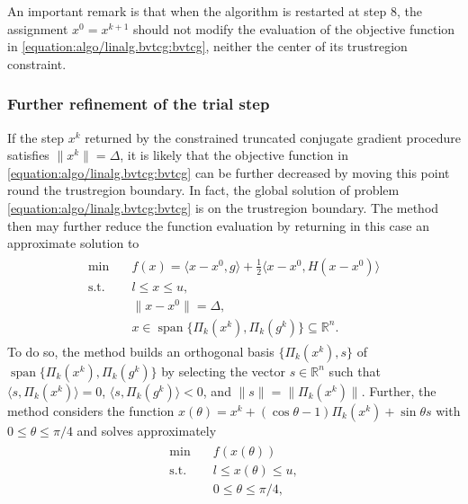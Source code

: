 \documentclass[letterpaper,10pt,english]{sphinxmanual}
\DeclareMathOperator{\vspan}{span}
\newcommand{\norm}[2][]{#1\lVert#2#1\rVert}
\newcommand{\set}[2][]{#1\{#2#1\}}
\newcommand{\inner}[2][]{#1\langle#2#1\rangle}
\def\R{\ensuremath{\mathds{R}}}
\begin{document}
\sphinxAtStartPar
An important remark is that when the algorithm is restarted at step 8, the
assignment \(x^0 = x^{k + 1}\) should not modify the evaluation of the
objective function in \eqref{equation:algo/linalg.bvtcg:bvtcg}, neither the center of its trust\sphinxhyphen{}region
constraint.


\subsubsection{Further refinement of the trial step}
\label{\detokenize{algo/linalg.bvtcg:further-refinement-of-the-trial-step}}
\sphinxAtStartPar
If the step \(x^k\) returned by the constrained truncated conjugate
gradient procedure satisfies \(\norm{x^k} = \Delta\), it is likely that
the objective function in \eqref{equation:algo/linalg.bvtcg:bvtcg} can be further decreased by moving this
point round the trust\sphinxhyphen{}region boundary. In fact, the global solution of problem
\eqref{equation:algo/linalg.bvtcg:bvtcg} is on the trust\sphinxhyphen{}region boundary. The method  then may
further reduce the function evaluation by returning in this case an approximate
solution to
\begin{equation*}
\begin{split}\begin{array}{ll}
    \min        & \quad f(x) = \inner{x - x^0, g} + \frac{1}{2} \inner{x - x^0, H (x - x^0)}\\
    \text{s.t.} & \quad l \le x \le u,\\
                & \quad \norm{x - x^0} = \Delta,\\
                & \quad x \in \vspan \set{\Pi_k(x^k), \Pi_k(g^k)} \subseteq \R^n.
\end{array}\end{split}
\end{equation*}
\sphinxAtStartPar
To do so, the method builds an orthogonal basis \(\set{\Pi_k(x^k), s}\) of
\(\vspan \set{\Pi_k(x^k), \Pi_k(g^k)}\) by selecting the vector
\(s \in \R^n\) such that \(\inner{s, \Pi_k(x^k)} = 0\),
\(\inner{s, \Pi_k(g^k)} < 0\), and \(\norm{s} = \norm{\Pi_k(x^k)}\).
Further, the method considers the function
\(x(\theta) = x^k + (\cos \theta - 1) \Pi_k(x^k) + \sin \theta s\) with
\(0 \le \theta \le \pi / 4\) and solves approximately
\begin{equation*}
\begin{split}\begin{array}{ll}
    \min        & \quad f(x(\theta))\\
    \text{s.t.} & \quad l \le x(\theta) \le u,\\
                & \quad 0 \le \theta \le \pi / 4,
\end{array}\end{split}
\end{equation*}
\end{document}
